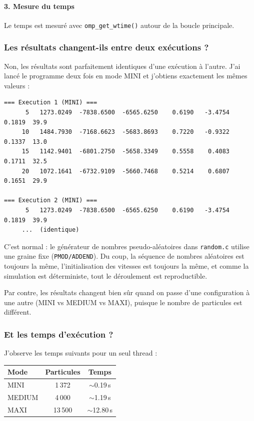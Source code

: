 \documentclass[12pt,a4paper]{article}
\begin{document}
\paragraph{\color{deeporange}3. Mesure du temps}

Le temps est mesuré avec \texttt{omp\_get\_wtime()} autour de la boucle principale.

\subsubsection{Les résultats changent-ils entre deux exécutions ?}

Non, les résultats sont parfaitement identiques d'une exécution à l'autre. J'ai lancé le programme deux fois en mode MINI et j'obtiens exactement les mêmes valeurs :

\begin{lstlisting}[style=outputstyle, title={\color{mainblue} Deux exécutions identiques (MINI)}]
=== Execution 1 (MINI) ===
      5   1273.0249  -7838.6500  -6565.6250    0.6190   -3.4754    0.1819  39.9
     10   1484.7930  -7168.6623  -5683.8693    0.7220   -0.9322    0.1337  13.0
     15   1142.9401  -6801.2750  -5658.3349    0.5558    0.4083    0.1711  32.5
     20   1072.1641  -6732.9109  -5660.7468    0.5214    0.6807    0.1651  29.9

=== Execution 2 (MINI) ===
      5   1273.0249  -7838.6500  -6565.6250    0.6190   -3.4754    0.1819  39.9
     ...  (identique)
\end{lstlisting}

C'est normal : le générateur de nombres pseudo-aléatoires dans \texttt{random.c} utilise une graine fixe (\texttt{PMOD/ADDEND}). Du coup, la séquence de nombres aléatoires est toujours la même, l'initialisation des vitesses est toujours la même, et comme la simulation est déterministe, tout le déroulement est reproductible.

Par contre, les résultats changent bien sûr quand on passe d'une configuration à une autre (MINI vs MEDIUM vs MAXI), puisque le nombre de particules est différent.

\subsubsection{Et les temps d'exécution ?}

J'observe les temps suivants pour un seul thread :

\begin{center}
\begin{tabular}{lcc}
\toprule
\textbf{\color{mainblue}Mode} & \textbf{\color{mainblue}Particules} & \textbf{\color{mainblue}Temps} \\
\midrule
MINI   & 1\,372  & $\sim$0.19\,s  \\
MEDIUM & 4\,000  & $\sim$1.19\,s  \\
MAXI   & 13\,500 & $\sim$12.80\,s \\
\bottomrule
\end{tabular}
\end{center}
\end{document}
